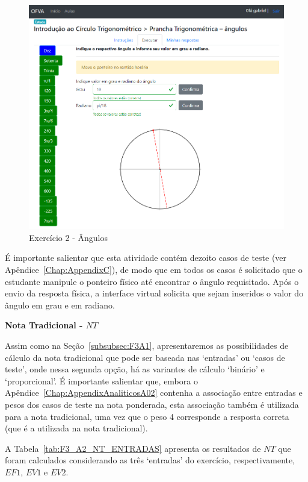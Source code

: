 \begin{figure}[htb]
	\centering
	\includegraphics[width=0.9\linewidth]{chapters/results/Fase 3/E2_Virtual.png}
	\caption{Exercício 2 - Ângulos}
	\label{fig:E2}
\end{figure}

É importante salientar que esta atividade contém dezoito casos de teste (ver Apêndice~\ref{Chap:AppendixC}), de modo que em todos os casos é solicitado que o estudante manipule o ponteiro físico até encontrar o ângulo requisitado. Após o envio da resposta física, a interface virtual solicita que sejam inseridos o valor do ângulo em grau e em radiano.

\textbf{Nota Tradicional - $NT$}

Assim como na Seção~\ref{subsubsec:F3A1}, apresentaremos as possibilidades de cálculo da nota tradicional que pode ser baseada nas `entradas' ou `casos de teste', onde nessa segunda opção, há as variantes de cálculo `binário' e `proporcional'. É importante salientar que, embora o Apêndice~\ref{Chap:AppendixAnaliticosA02} contenha a associação entre entradas e pesos dos casos de teste na nota ponderada, esta associação também é utilizada para a nota tradicional, uma vez que o peso 4 corresponde a resposta correta (que é a utilizada na nota tradicional).

A Tabela~\ref{tab:F3_A2_NT_ENTRADAS} apresenta os resultados de $NT$ que foram calculados considerando as três `entradas' do exercício, respectivamente, $EF1$, $EV1$ e $EV2$.


